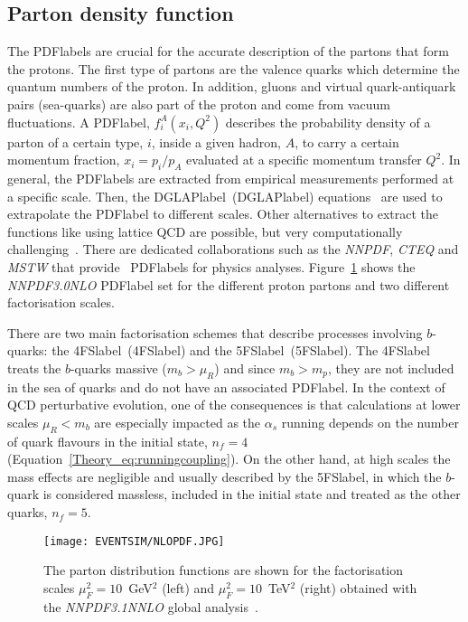 \subsection{Parton density function}

The \acrshort{PDFlabel}s are crucial for the accurate description of the partons that form the protons. The first type of partons are the valence quarks which determine the quantum numbers of the proton. In addition, gluons and virtual quark-antiquark pairs (sea-quarks) are also part of the proton and come from vacuum fluctuations. A \acrshort{PDFlabel}, $f_i^A(x_i,Q^2)$ describes the probability density of a parton of a certain type, $i$, inside a given hadron, $A$, to carry a certain momentum fraction, $x_i=p_i/p_A$ evaluated at a specific momentum transfer $Q^2$. In general, the \acrshort{PDFlabel}s are extracted from empirical measurements performed at a specific scale. Then, the \acrlong{DGLAPlabel}~(\acrshort{DGLAPlabel}) equations~\cite{DGLAP1,DGLAP2,DGLAP3} are used to extrapolate the \acrshort{PDFlabel} to different scales. Other alternatives to extract the functions like using lattice \acrshort{QCD} are possible, but very computationally challenging~\cite{Bhat_2021}.
There are dedicated collaborations such as the \textit{NNPDF}, \textit{CTEQ} and \textit{MSTW} that provide~\cite{Ball_2015,LesHouches,Martin_2009}
 \acrshort{PDFlabel}s for physics analyses. Figure~\ref{figEVNTSIM:PDF} shows the \textit{NNPDF3.0NLO} \acrshort{PDFlabel} set for the different proton partons and two different factorisation scales.

 There are two main factorisation schemes that describe processes involving $b$-quarks: the \acrlong{4FSlabel}~(\acrshort{4FSlabel}) and the \acrlong{5FSlabel}~(\acrshort{5FSlabel}). The \acrshort{4FSlabel} treats the $b$-quarks massive ($m_b>\mu_R$) and since $m_b>m_p$, they are not included in the sea of quarks and do not have an associated \acrshort{PDFlabel}. In the context of \acrshort{QCD} perturbative evolution, one of the consequences is that calculations at lower scales $\mu_R<m_b$ are especially impacted as the $\alpha_s$ running depends on the number of quark flavours in the initial state, $n_f=4$ (Equation~\ref{Theory_eq:runningcoupling}). On the other hand, at high scales the mass effects are negligible and usually described by the \acrshort{5FSlabel}, in which the $b$-quark is considered massless, included in the initial state and treated as the other quarks, $n_f=5$. 

 \begin{figure}[hbtp]
    \RawFloats
    \begin{center}
    \texttt{[image: EVENTSIM/NLOPDF.JPG]}
    \caption{
        The parton distribution functions are shown for the factorisation scales $\mu_F^2=10$~GeV$^2$ (left) and $\mu_F^2=10$~TeV$^2$ (right) obtained with the \textit{NNPDF3.1NNLO} global analysis~\cite{Ball_2017}.}
    \label{figEVNTSIM:PDF}
    \end{center}
\end{figure}

